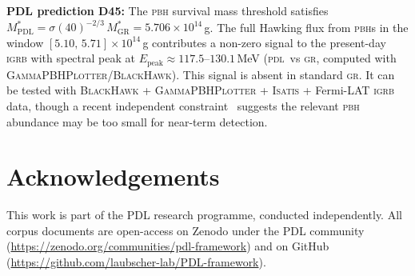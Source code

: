 \documentclass[12pt, a4paper]{article}
\theoremstyle{definition}
\newenvironment{prediction}[1][]{%
  \begin{tcolorbox}[colback=blue!5, colframe=blue!50!black,
    title={\textbf{Falsifiable prediction — #1}}, fonttitle=\bfseries]}
  {\end{tcolorbox}}
\newcommand{\PDL}{\textsc{pdl}}
\newcommand{\MstarGR}{M^{*}_{\mathrm{GR}}}
\newcommand{\MstarPDL}{M^{*}_{\mathrm{PDL}}}
\begin{document}
\begin{prediction}[Summary]
\textbf{PDL prediction D45:} The \textsc{pbh} survival mass threshold satisfies $\MstarPDL = \sigma(40)^{-2/3}\,\MstarGR = 5.706\times10^{14}$\,g. The full Hawking flux from \textsc{pbh}s in the window $[5.10,\,5.71]\times10^{14}$\,g contributes a non-zero signal to the present-day \textsc{igrb} with spectral peak at $E_{\mathrm{peak}} \approx 117.5$--$130.1$\,MeV (\PDL\ vs \textsc{gr}, computed with \textsc{GammaPBHPlotter}/\textsc{BlackHawk}). This signal is absent in standard \textsc{gr}. It can be tested with \textsc{BlackHawk} + \textsc{GammaPBHPlotter} + \textsc{Isatis} + Fermi-LAT \textsc{igrb} data, though a recent independent constraint~\cite{Cholis2026} suggests the relevant \textsc{pbh} abundance may be too small for near-term detection.
\end{prediction}

\section*{Acknowledgements}

This work is part of the PDL research programme, conducted independently. All corpus documents are open-access on Zenodo under the PDL community (\url{https://zenodo.org/communities/pdl-framework}) and on GitHub (\url{https://github.com/laubscher-lab/PDL-framework}).


\end{document}
